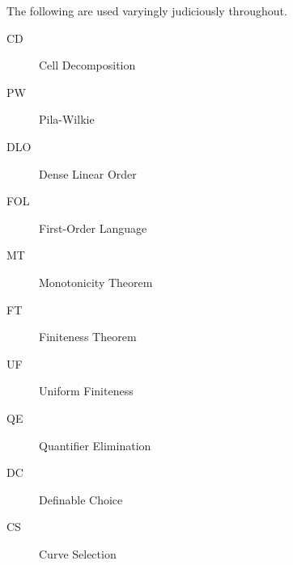 %
%


The following are used varyingly judiciously throughout.
\begin{description}
\item[CD]{Cell Decomposition}
\item[PW]{Pila-Wilkie}
\item[DLO]{Dense Linear Order}
\item[FOL]{First-Order Language}
\item[MT]{Monotonicity Theorem}
\item[FT]{Finiteness Theorem}
\item[UF]{Uniform Finiteness}
\item[QE]{Quantifier Elimination}
\item[DC]{Definable Choice}
\item[CS]{Curve Selection}
\end{description}

